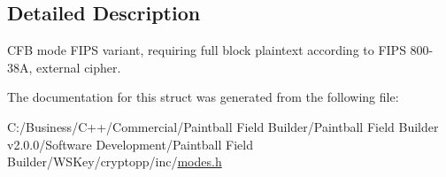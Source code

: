 \subsection{Detailed Description}
CFB mode FIPS variant, requiring full block plaintext according to FIPS 800-\/38A, external cipher. 

The documentation for this struct was generated from the following file:\begin{DoxyCompactItemize}
\item 
C:/Business/C++/Commercial/Paintball Field Builder/Paintball Field Builder v2.0.0/Software Development/Paintball Field Builder/WSKey/cryptopp/inc/\hyperlink{modes_8h}{modes.h}\end{DoxyCompactItemize}
